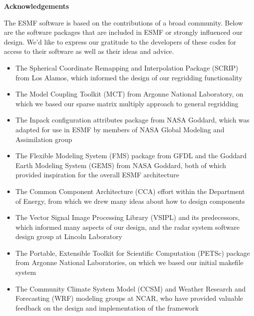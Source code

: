 
\vspace{2in}
\begin{center}
{\bf Acknowledgements}
\end{center}

The ESMF software is based on the contributions of a broad community.
Below are the software packages that are included in ESMF or strongly 
influenced our design.  We'd like to express our gratitude to the 
developers of these codes for access to their software as well as their 
ideas and advice.

\begin{itemize}

\item The Spherical Coordinate Remapping and Interpolation Package (SCRIP) 
from Los Alamos, which informed the design of our regridding functionality

\item The Model Coupling Toolkit (MCT) from Argonne National Laboratory,
on which we based our sparse matrix multiply approach to general 
regridding

\item The Inpack configuration attributes package from NASA Goddard, 
which was adapted for use in ESMF by members of NASA Global Modeling and 
Assimilation group

\item The Flexible Modeling System (FMS) package from GFDL and the 
Goddard Earth Modeling System (GEMS) from NASA Goddard, both of which 
provided inspiration for the overall ESMF architecture 

\item The Common Component Architecture (CCA) effort within the Department
of Energy, from which we drew many ideas about how to design components

\item The Vector Signal Image Processing Library (VSIPL) and its
predecessors, which informed many aspects of our design, and the 
radar system software design group at Lincoln Laboratory

\item The Portable, Extensible Toolkit for Scientific Computation (PETSc) 
package from Argonne National Laboratories, on which we 
based our initial makefile system

\item The Community Climate System Model (CCSM) and Weather Research and
Forecasting (WRF) modeling groups at NCAR, who have provided valuable
feedback on the design and implementation of the framework

\end{itemize}